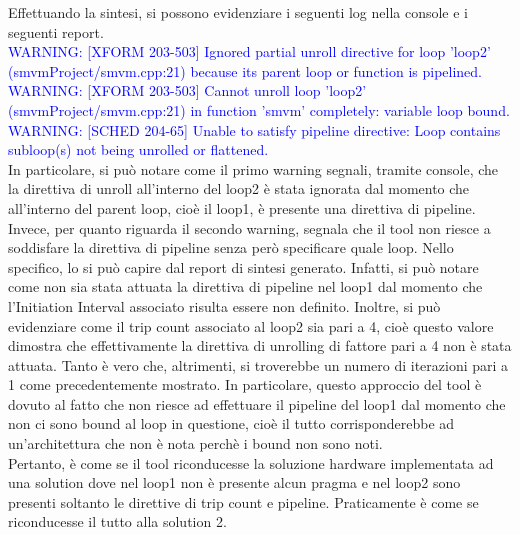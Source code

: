 

Effettuando la sintesi, si possono evidenziare i seguenti log nella console e i seguenti report.
\\
\textcolor{blue}{WARNING: [XFORM 203-503] Ignored partial unroll directive for loop 'loop2' (smvmProject/smvm.cpp:21) because its parent loop or function is pipelined.}
\\
\textcolor{blue}{WARNING: [XFORM 203-503] Cannot unroll loop 'loop2' (smvmProject/smvm.cpp:21) in function 'smvm' completely: variable loop bound.}
\\
\textcolor{blue}{WARNING: [SCHED 204-65] Unable to satisfy pipeline directive: Loop contains subloop(s) not being unrolled or flattened.}
\\
In particolare, si può notare come il primo warning segnali, tramite console, che la direttiva di unroll all'interno del loop2 è stata ignorata dal momento che all'interno del parent loop, cioè il loop1, è presente una direttiva di pipeline. Invece, per quanto riguarda il secondo warning, segnala che il tool non riesce a soddisfare la direttiva di pipeline senza però specificare quale loop. Nello specifico, lo si può capire dal report di sintesi generato. Infatti, si può notare come non sia stata attuata la direttiva di pipeline nel loop1 dal momento che l'Initiation Interval associato risulta essere non definito. Inoltre, si può evidenziare come il trip count associato al loop2 sia pari a 4, cioè questo valore dimostra che effettivamente la direttiva di unrolling di fattore pari a 4 non è stata attuata. Tanto è vero che, altrimenti, si troverebbe un numero di iterazioni pari a 1 come precedentemente mostrato. In particolare, questo approccio del tool è dovuto al fatto che non riesce ad effettuare il pipeline del loop1 dal momento che non ci sono bound al loop in questione, cioè il tutto corrisponderebbe ad un'architettura che non è nota perchè i bound non sono noti.
\\
Pertanto, è come se il tool riconducesse la soluzione hardware implementata ad una solution dove nel loop1 non è presente alcun pragma e nel loop2 sono presenti soltanto le direttive di trip count e pipeline. Praticamente è come se riconducesse il tutto alla solution 2.

